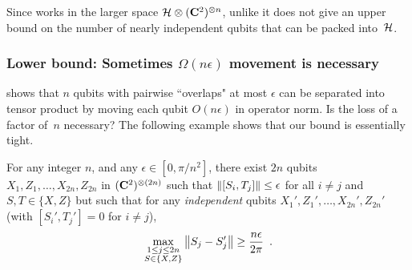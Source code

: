 \documentclass[preprintnumbers,11pt,onecolumn]{article}
\begin{document}
Since  works in the larger space ${\mathcal H} \otimes ({\bf C}^2)^{\otimes n}$, unlike  it does not give an upper bound on the number of nearly independent qubits that can be packed into~${\mathcal H}$.  


\subsubsection{Lower bound: Sometimes $\Omega(n \epsilon)$ movement is necessary}

 shows that $n$ qubits with pairwise ``overlaps" at most $\epsilon$ can be separated into tensor product by moving each qubit $O(n \epsilon)$ in operator norm.  Is the loss of a factor of~$n$ necessary?  The following example shows that our bound is essentially tight.  

\begin{lemma} \label{t:movementlowerbound}
For any integer $n$, and any $\epsilon \in [0, \pi / n^2]$, there exist $2 n$ qubits $X_1, Z_1, \ldots, X_{2n}, Z_{2n}$ in $({\bf C}^2)^{\otimes (2n)}$ such that ${\| [S_i, T_j] \|} \leq \epsilon$ for all $i \neq j$ and $S,T\in\{X,Z\}$ but such that for any \emph{independent} qubits $X_1', Z_1', \ldots, X_{2n}', Z_{2n}'$ (with $[S_i', T_j'] = 0$ for $i \neq j$), 
\begin{equation*}
\max_{\substack{1 \leq j \leq 2n \\ S \in \{X, Z\}}} {\big\| S_j - S_j' \big\|} \geq \frac{n \epsilon}{2 \pi}
 \enspace .
\end{equation*}
\end{lemma}
\end{document}
